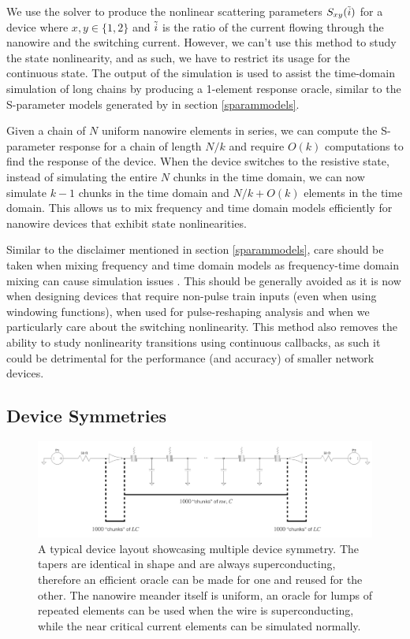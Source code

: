 We use the  solver to produce the nonlinear scattering parameters $S_{xy}(\Tilde i)$
for a device where $x, y\in \{1, 2\}$ and $\Tilde i$ is the ratio of the current flowing through the nanowire
and the switching current. However, we can't use this method to study the state nonlinearity, and as such,
we have to restrict its usage for the continuous state. The output of the simulation is used to assist
the time-domain simulation of long chains by producing a 1-element response oracle, similar to the S-parameter
models generated by  in section \ref{sparammodels}. 

Given a chain of $N$ uniform nanowire elements in series, we can compute the S-parameter response for a chain 
of length $N/k$ and require $O(k)$ computations to find the response of the device. When the device switches to
the resistive state, instead of simulating the entire $N$ chunks in the time domain, we can now simulate
$k-1$ chunks in the time domain and $N/k+O(k)$ elements in the time domain. This allows us to mix frequency
and time domain models efficiently for nanowire devices that exhibit state nonlinearities. 

Similar to the disclaimer mentioned in section \ref{sparammodels}, care should be taken when mixing frequency and time
domain models as frequency-time domain mixing can cause simulation issues \cite{td-fd-mixing}. This should be
generally avoided as it is now when designing devices that require non-pulse train inputs (even when using 
windowing functions), when used for pulse-reshaping analysis and when we particularly care about the switching
nonlinearity. This method also removes the ability to study nonlinearity transitions using continuous callbacks,
as such it could be detrimental for the performance (and accuracy) of smaller network devices.

\subsection{Device Symmetries}

\begin{figure}
    \centering
    \includegraphics[width=\textwidth]{figs/juliasimsymmetry.png}
    \caption{A typical device layout showcasing multiple device symmetry. The tapers are identical in
    shape and are always superconducting, therefore an efficient oracle can be made for one and reused 
    for the other. The nanowire meander itself is uniform, an oracle for lumps of repeated elements can 
    be used when the wire is superconducting, while the near critical current elements can be simulated
    normally.}
    \label{fig:juliasimsymmetry}
\end{figure}

